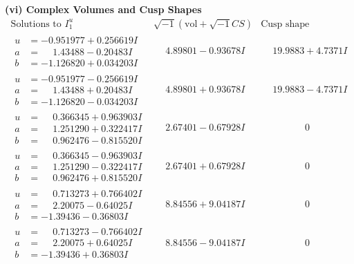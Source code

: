 \documentclass[1p]{elsarticle_modified}
\theoremstyle{definition}
\newcommand{\I}{\sqrt{-1}}
\begin{document}
\newpage\flushleft \textbf{(vi) Complex Volumes and Cusp Shapes}
$$\begin{array}{c|c|c}  
\text{Solutions to }I^u_{1}& \I (\text{vol} + \sqrt{-1}CS) & \text{Cusp shape}\\
 \hline 
\begin{aligned}
u &= -0.951977 + 0.256619 I \\
a &= \phantom{-}1.43488 - 0.20483 I \\
b &= -1.126820 + 0.034203 I\end{aligned}
 & \phantom{-}4.89801 - 0.93678 I & \phantom{-}19.9883 + 4.7371 I \\ \hline\begin{aligned}
u &= -0.951977 - 0.256619 I \\
a &= \phantom{-}1.43488 + 0.20483 I \\
b &= -1.126820 - 0.034203 I\end{aligned}
 & \phantom{-}4.89801 + 0.93678 I & \phantom{-}19.9883 - 4.7371 I \\ \hline\begin{aligned}
u &= \phantom{-}0.366345 + 0.963903 I \\
a &= \phantom{-}1.251290 + 0.322417 I \\
b &= \phantom{-}0.962476 - 0.815520 I\end{aligned}
 & \phantom{-}2.67401 - 0.67928 I & \phantom{-0.000000 } 0 \\ \hline\begin{aligned}
u &= \phantom{-}0.366345 - 0.963903 I \\
a &= \phantom{-}1.251290 - 0.322417 I \\
b &= \phantom{-}0.962476 + 0.815520 I\end{aligned}
 & \phantom{-}2.67401 + 0.67928 I & \phantom{-0.000000 } 0 \\ \hline\begin{aligned}
u &= \phantom{-}0.713273 + 0.766402 I \\
a &= \phantom{-}2.20075 - 0.64025 I \\
b &= -1.39436 - 0.36803 I\end{aligned}
 & \phantom{-}8.84556 + 9.04187 I & \phantom{-0.000000 } 0 \\ \hline\begin{aligned}
u &= \phantom{-}0.713273 - 0.766402 I \\
a &= \phantom{-}2.20075 + 0.64025 I \\
b &= -1.39436 + 0.36803 I\end{aligned}
 & \phantom{-}8.84556 - 9.04187 I & \phantom{-0.000000 } 0 \\ \hline\begin{aligned}

\end{aligned}
\end{array}$$
\end{document}

